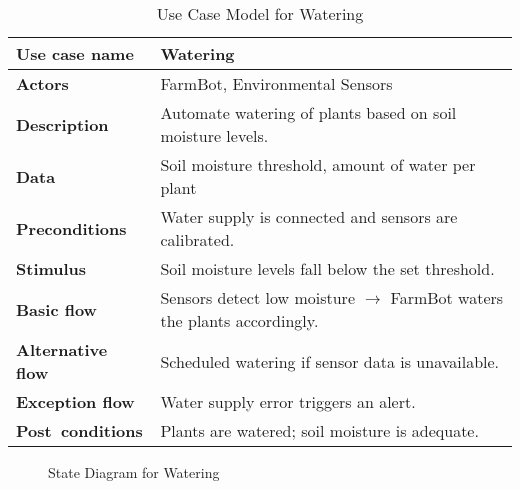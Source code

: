 \begin{table}[H]
\centering
\begin{tabular}{|p{4cm}|p{9cm}|}
\hline
\textbf{Use case name}    & Watering \\
\hline
\textbf{Actors}           & FarmBot, Environmental Sensors \\
\hline
\textbf{Description}      & Automate watering of plants based on soil moisture levels. \\
\hline
\textbf{Data}             & Soil moisture threshold, amount of water per plant \\
\hline
\textbf{Preconditions}    & Water supply is connected and sensors are calibrated. \\
\hline
\textbf{Stimulus}         & Soil moisture levels fall below the set threshold. \\
\hline
\textbf{Basic flow}       & Sensors detect low moisture $\rightarrow$ FarmBot waters the plants accordingly. \\
\hline
\textbf{Alternative flow} & Scheduled watering if sensor data is unavailable. \\
\hline
\textbf{Exception flow}   & Water supply error triggers an alert. \\
\hline
\textbf{Post conditions}  & Plants are watered; soil moisture is adequate. \\
\hline
\end{tabular}
\caption{Use Case Model for Watering}
\end{table}

\begin{figure}[H]
    \centering

\caption{State Diagram for Watering}
\end{figure}


